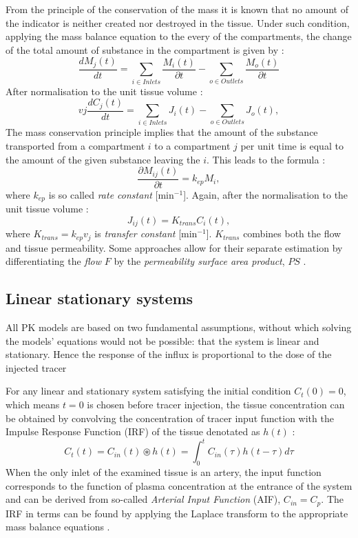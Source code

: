 From the principle of the conservation of the mass it is known that no amount of the indicator is neither created nor destroyed in the tissue. Under such condition, applying the mass balance equation to the every of the compartments, the change of the total amount of substance in the compartment is given by \cite{thesis}:
\begin{equation}
\frac{dM_j(t)}{dt} = \sum_{i \in Inlets}\frac{M_i(t)}{\partial t}-\sum_{o \in Outlets}\frac{M_o(t)}{\partial t} 
\label{eq:pk4}
\end{equation}
After normalisation to the unit tissue volume \cite{thesis}:
\begin{equation}
vj\frac{dC_j(t)}{dt} = \sum_{i \in Inlets}J_i(t)-\sum_{o \in Outlets}J_o(t) ,
\label{eq:pk5}
\end{equation}
The mass conservation principle implies that the amount of the substance transported from a compartment $i$ to a compartment $j$ per unit time is equal to the amount of the given substance leaving the $i$. This leads to the formula \cite{thesis}:
\begin{equation}
\frac{\partial M_{ij}(t)}{\partial t} = k_{ep}M_i,
\label{eq:pk6}
\end{equation}
where $k_{ep}$ is so called \textit{rate constant} [min$^{-1}$]. Again, after the normalisation to the unit tissue volume \cite{thesis}:
\begin{equation}
J_{ij}(t) = K_{trans}C_i(t),
\label{eq:pk7}
\end{equation}
where $K_{trans}=k_{ep}v_j$ is \textit{transfer constant} [min$^{-1}$]. $K_{trans}$ combines both the flow and tissue permeability. Some approaches allow for their separate estimation by differentiating the \textit{flow} $F$ by the \textit{permeability surface area product}, $PS$ \cite{thesis}. 

\subsection{Linear stationary systems}
All PK models are based on two fundamental assumptions, without which solving the models' equations would not be possible: that the system is linear and stationary. Hence the response of the influx is proportional to the dose of the injected tracer \cite{thesis, sourbron2011scope} 

For any linear and stationary system satisfying the 
initial condition $C_t(0) = 0$, which means $t = 0$ is chosen before tracer injection,
the tissue concentration can be obtained by convolving the concentration of tracer input function with the Impulse Response Function (IRF) of the tissue denotated as $h(t)$ \cite{sourbron2011scope}: 
\begin{equation}
	\label{eq:convolution}
	C_{t}(t) = C_{in}(t)\circledast h(t) = \int_{0}^{t}C_{in}(\tau)h(t-\tau)d\tau 
\end{equation}
When the only inlet of the examined tissue is an artery, the input function corresponds to the function of plasma concentration at the entrance of the system and can be derived from so-called \textit{Arterial Input Function} (AIF), $C_{in} = C_{p}$. The IRF in terms can be found by applying the Laplace transform to the appropriate mass balance equations \cite{thesis}.
\newpage

